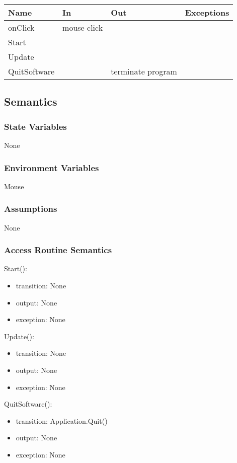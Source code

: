 \documentclass[12pt, titlepage]{article}
\begin{document}
\begin{center}
\begin{tabular}{|l|l|l|p{5cm}|}
\hline
\textbf{Name} & \textbf{In} & \textbf{Out} & \textbf{Exceptions} \\
\hline
onClick & mouse click &  &  \\
\hline
Start & & & \\
\hline
Update & & & \\
\hline
QuitSoftware & & terminate program & \\
\hline
\end{tabular}
\end{center}

\subsection{Semantics}

\subsubsection{State Variables}
None

\subsubsection{Environment Variables}
Mouse
\subsubsection{Assumptions}
None
\subsubsection{Access Routine Semantics}

\noindent Start():
\begin{itemize}
\item transition: None
\item output: None
\item exception: None
\end{itemize}

\noindent Update():
\begin{itemize}
\item transition: None
\item output: None
\item exception: None
\end{itemize}

\noindent QuitSoftware():
\begin{itemize}
\item transition: Application.Quit()
\item output: None
\item exception: None
\end{itemize}
\end{document}
